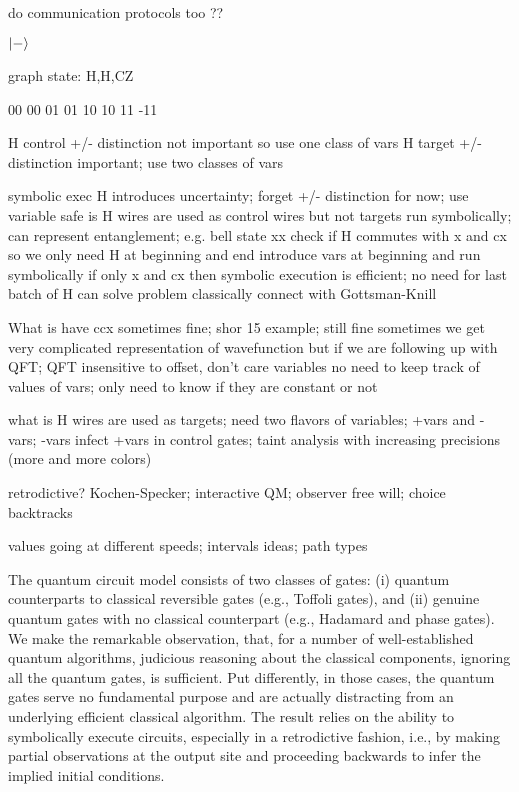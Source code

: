 \documentclass{article}
\begin{document}
\begin{refsection}
\newpage

do communication protocols too ??

$\ket{-}$ 

graph state: H,H,CZ

00   00
01   01
10   10
11 -11

H control +/- distinction not important so use one class of vars
H target +/- distinction important; use two classes of vars

  
  symbolic exec
  H introduces uncertainty; forget +/- distinction for now; use variable
  safe is H wires are used as control wires but not targets
  run symbolically; can represent entanglement; e.g. bell state xx
  check if H commutes with x and cx
  so we only need H at beginning and end
  introduce vars at beginning and run symbolically
  if only x and cx then symbolic execution is efficient; no need for last batch of H
  can solve problem classically
  connect with Gottsman-Knill

  What is have ccx
  sometimes fine; shor 15 example; still fine
  sometimes we get very complicated representation of wavefunction
  but if we are following up with QFT; QFT insensitive to offset, don't care variables
  no need to keep track of values of vars; only need to know if they are constant or not

  what is H wires are used as targets; need two flavors of variables; +vars and -vars;
  -vars infect +vars in control gates; taint analysis with increasing precisions (more
  and more colors)

  retrodictive? Kochen-Specker; interactive QM; observer free will; choice backtracks

  values going at different speeds; intervals ideas; path types

  
The quantum circuit model consists of two classes of gates: (i)
quantum counterparts to classical reversible gates (e.g., Toffoli
gates), and (ii) genuine quantum gates with no classical counterpart
(e.g., Hadamard and phase gates). We make the remarkable observation,
that, for a number of well-established quantum algorithms, judicious
reasoning about the classical components, ignoring all the quantum
gates, is sufficient. Put differently, in those cases, the quantum
gates serve no fundamental purpose and are actually distracting from
an underlying efficient classical algorithm. The result relies on the
ability to symbolically execute circuits, especially in a retrodictive
fashion, i.e., by making partial observations at the output site and
proceeding backwards to infer the implied initial conditions.



\end{refsection}
\end{document}
